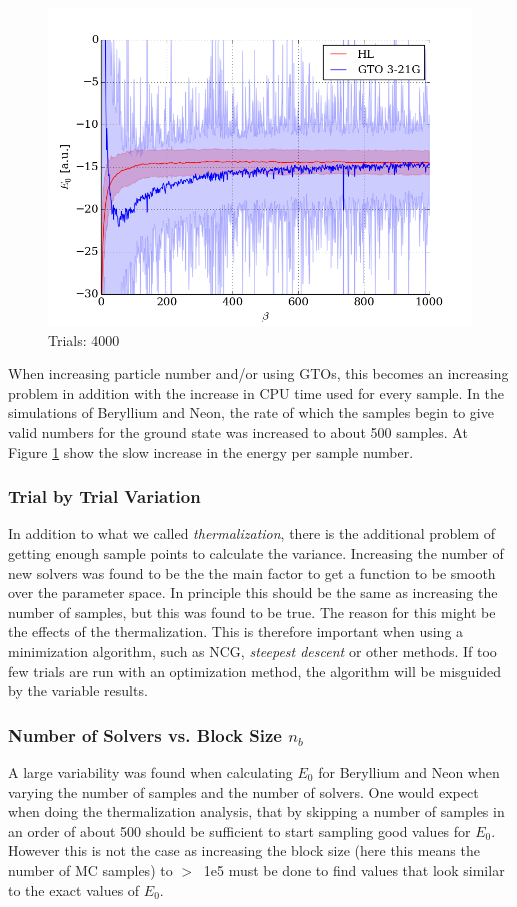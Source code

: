 \documentclass[twocolumns, a4paper,11pt,fleqn]{extarticle}
\begin{document}
\begin{figure}[H]
	\includegraphics[width=\columnwidth]{../res/plot/beryllium_04/beryllium_04_pretty.png}
	\caption{Trials: 4000}
	\label{fig:beryllium_04}
\end{figure}

When increasing particle number and/or using GTOs, this becomes an increasing problem
in addition with the increase in CPU time used for every sample. In the 
simulations of Beryllium and Neon, the rate of which the samples begin to give
valid numbers for the ground state was increased to about 500 samples. At 
Figure \ref{fig:beryllium_04} show the slow increase in the energy per sample number. 

\subsubsection{Trial by Trial Variation}
In addition to what we called \textit{thermalization}, 
there is the additional problem of getting 
enough sample points to calculate the variance. Increasing the number of new solvers 
was found to be the
the main factor to get a function to be smooth over the parameter space.
In principle this should be the same as increasing the number of samples,
but this was found to be true. The reason for this might be the effects of
the thermalization.
This is therefore
important when using a minimization algorithm, such as NCG, \textit{steepest descent}
or other methods. If too few trials are run with an optimization method, the 
algorithm will be misguided by the variable results.

\subsubsection{Number of Solvers vs. Block Size $n_b$}
A large variability was found when calculating $E_0$ for Beryllium and Neon when 
varying the number of samples and the number of solvers. One would expect
when doing the thermalization analysis, that by skipping a number of samples in
an order of about 500 should be sufficient to start sampling good values for $E_0$. 
However this is not the case as increasing the block size 
(here this means the number of MC samples) to $> \:$ 
1e5 must be done to find
values that look similar to the exact values of $E_0$.
\end{document}
